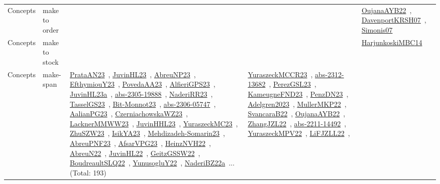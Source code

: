 {\begin{longtable}{lp{3cm}>{\raggedright\arraybackslash}p{6cm}>{\raggedright\arraybackslash}p{6cm}>{\raggedright\arraybackslash}p{8cm}}
Concepts & make to order &  &  & \href{works/OujanaAYB22.pdf}{OujanaAYB22}~\cite{OujanaAYB22}, \href{works/DavenportKRSH07.pdf}{DavenportKRSH07}~\cite{DavenportKRSH07}, \href{works/Simonis07.pdf}{Simonis07}~\cite{Simonis07}\\
Concepts & make to stock &  &  & \href{works/HarjunkoskiMBC14.pdf}{HarjunkoskiMBC14}~\cite{HarjunkoskiMBC14}\\
Concepts & make-span & \href{works/PrataAN23.pdf}{PrataAN23}~\cite{PrataAN23}, \href{works/JuvinHL23.pdf}{JuvinHL23}~\cite{JuvinHL23}, \href{works/AbreuNP23.pdf}{AbreuNP23}~\cite{AbreuNP23}, \href{works/EfthymiouY23.pdf}{EfthymiouY23}~\cite{EfthymiouY23}, \href{works/PovedaAA23.pdf}{PovedaAA23}~\cite{PovedaAA23}, \href{works/AlfieriGPS23.pdf}{AlfieriGPS23}~\cite{AlfieriGPS23}, \href{works/JuvinHL23a.pdf}{JuvinHL23a}~\cite{JuvinHL23a}, \href{works/abs-2305-19888.pdf}{abs-2305-19888}~\cite{abs-2305-19888}, \href{works/NaderiRR23.pdf}{NaderiRR23}~\cite{NaderiRR23}, \href{works/TasselGS23.pdf}{TasselGS23}~\cite{TasselGS23}, \href{works/Bit-Monnot23.pdf}{Bit-Monnot23}~\cite{Bit-Monnot23}, \href{works/abs-2306-05747.pdf}{abs-2306-05747}~\cite{abs-2306-05747}, \href{works/AalianPG23.pdf}{AalianPG23}~\cite{AalianPG23}, \href{works/CzerniachowskaWZ23.pdf}{CzerniachowskaWZ23}~\cite{CzerniachowskaWZ23}, \href{works/LacknerMMWW23.pdf}{LacknerMMWW23}~\cite{LacknerMMWW23}, \href{works/JuvinHHL23.pdf}{JuvinHHL23}~\cite{JuvinHHL23}, \href{works/YuraszeckMC23.pdf}{YuraszeckMC23}~\cite{YuraszeckMC23}, \href{works/ZhuSZW23.pdf}{ZhuSZW23}~\cite{ZhuSZW23}, \href{works/IsikYA23.pdf}{IsikYA23}~\cite{IsikYA23}, \href{works/Mehdizadeh-Somarin23.pdf}{Mehdizadeh-Somarin23}~\cite{Mehdizadeh-Somarin23}, \href{works/AbreuPNF23.pdf}{AbreuPNF23}~\cite{AbreuPNF23}, \href{works/AfsarVPG23.pdf}{AfsarVPG23}~\cite{AfsarVPG23}, \href{works/HeinzNVH22.pdf}{HeinzNVH22}~\cite{HeinzNVH22}, \href{works/AbreuN22.pdf}{AbreuN22}~\cite{AbreuN22}, \href{works/JuvinHL22.pdf}{JuvinHL22}~\cite{JuvinHL22}, \href{works/GeitzGSSW22.pdf}{GeitzGSSW22}~\cite{GeitzGSSW22}, \href{works/BoudreaultSLQ22.pdf}{BoudreaultSLQ22}~\cite{BoudreaultSLQ22}, \href{works/YunusogluY22.pdf}{YunusogluY22}~\cite{YunusogluY22}, \href{works/NaderiBZ22a.pdf}{NaderiBZ22a}~\cite{NaderiBZ22a}... (Total: 193) & \href{works/YuraszeckMCCR23.pdf}{YuraszeckMCCR23}~\cite{YuraszeckMCCR23}, \href{works/abs-2312-13682.pdf}{abs-2312-13682}~\cite{abs-2312-13682}, \href{works/PerezGSL23.pdf}{PerezGSL23}~\cite{PerezGSL23}, \href{works/KameugneFND23.pdf}{KameugneFND23}~\cite{KameugneFND23}, \href{works/PenzDN23.pdf}{PenzDN23}~\cite{PenzDN23}, \href{works/Adelgren2023.pdf}{Adelgren2023}~\cite{Adelgren2023}, \href{works/MullerMKP22.pdf}{MullerMKP22}~\cite{MullerMKP22}, \href{works/SvancaraB22.pdf}{SvancaraB22}~\cite{SvancaraB22}, \href{works/OujanaAYB22.pdf}{OujanaAYB22}~\cite{OujanaAYB22}, \href{works/ZhangJZL22.pdf}{ZhangJZL22}~\cite{ZhangJZL22}, \href{works/abs-2211-14492.pdf}{abs-2211-14492}~\cite{abs-2211-14492}, \href{works/YuraszeckMPV22.pdf}{YuraszeckMPV22}~\cite{YuraszeckMPV22}, \href{works/LiFJZLL22.pdf}{LiFJZLL22}~\cite{LiFJZLL22}, 
\end{longtable}}
